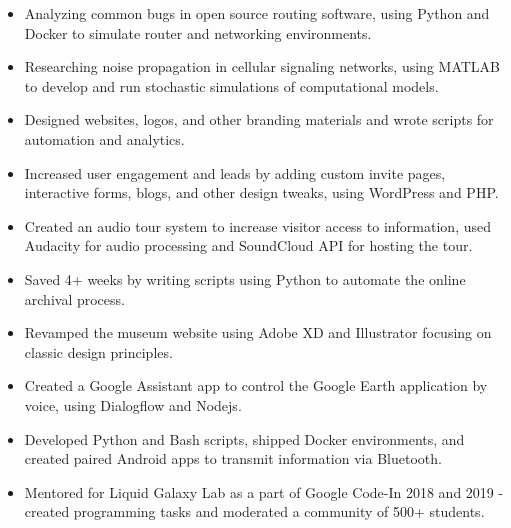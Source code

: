 \documentclass[a4paper]{resume}
\begin{document}
\begin{itemize} \vspace{-5pt} \itemsep -2pt
	\item Analyzing common bugs in open source routing software, using Python and Docker to simulate router and networking environments. 
\end{itemize}
\enresubsection
{}
\begin{itemize} \vspace{-5pt} \itemsep -2pt
	\item Researching noise propagation in cellular signaling networks, using MATLAB to develop and run stochastic simulations of computational models. 
\end{itemize}
\enresubsection
{}
\begin{itemize} \vspace{-5pt} \itemsep -2pt
	\item Designed websites, logos, and other branding materials and wrote scripts for automation and analytics.
	\item Increased user engagement and leads by adding custom invite pages, interactive forms, blogs, and other design tweaks, using WordPress and PHP.
\end{itemize}
\enresubsection
{}
\begin{itemize} \vspace{-5pt} \itemsep -2pt
	\item Created an audio tour system to increase visitor access to information, used Audacity for audio processing and SoundCloud API for hosting the tour.
	\item Saved 4+ weeks by writing scripts using Python to automate the online archival process.
	\item Revamped the museum website using Adobe XD and Illustrator focusing on classic design principles.
\end{itemize}
\enresubsection
{}
\begin{itemize} \vspace{-5pt} \itemsep -2pt
	\item Created a Google Assistant app to control the Google Earth application by voice, using Dialogflow and Nodejs.
	\item Developed Python and Bash scripts, shipped Docker environments, and created paired Android apps to transmit information via Bluetooth.
	\item Mentored for Liquid Galaxy Lab as a part of Google Code-In 2018 and 2019 - created programming tasks and moderated a community of 500+ students.
\end{itemize}
\enresection
\end{document}
